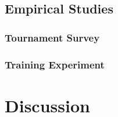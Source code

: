 \subsection{Empirical Studies}

      \subsubsection{Tournament Survey}

      \subsubsection{Training Experiment}




\section{Discussion}
